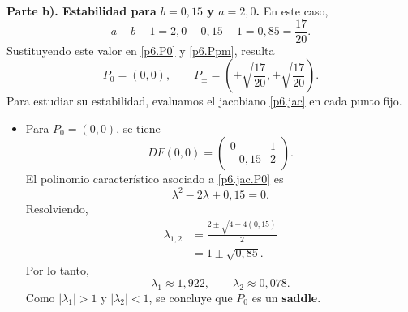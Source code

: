 \documentclass[12pt]{article}
\begin{document}
\textbf{Parte b). Estabilidad para $b=0{,}15$ y $a=2{,}0$.}
En este caso,
\begin{equation*}
    a-b-1=2{,}0-0{,}15-1=0{,}85=\frac{17}{20}.
\end{equation*}
Sustituyendo este valor en \eqref{p6.P0} y \eqref{p6.Ppm}, resulta
\begin{equation}\label{p6.fijos.a2}
    P_0=(0,0),
    \qquad
    P_\pm=\left(\pm\sqrt{\frac{17}{20}},\pm\sqrt{\frac{17}{20}}\right).
\end{equation}
Para estudiar su estabilidad, evaluamos el jacobiano \eqref{p6.jac} en cada punto fijo.

\begin{itemize}
    \item Para $P_0=(0,0)$, se tiene
    \begin{equation}\label{p6.jac.P0}
        DF(0,0)=
        \begin{pmatrix}
            0 & 1\\
            -0{,}15 & 2
        \end{pmatrix}.
    \end{equation}
    El polinomio característico asociado a \eqref{p6.jac.P0} es
    \begin{equation*}
        \lambda^2-2\lambda+0{,}15=0.
    \end{equation*}
    Resolviendo,
    \begin{align*}
        \lambda_{1,2}
        &=\frac{2\pm\sqrt{4-4(0{,}15)}}{2}\\
        &=1\pm\sqrt{0{,}85}.
    \end{align*}
    Por lo tanto,
    \begin{equation*}
        \lambda_1\approx 1{,}922,
        \qquad
        \lambda_2\approx 0{,}078.
    \end{equation*}
    Como $|\lambda_1|>1$ y $|\lambda_2|<1$, se concluye que $P_0$ es un \textbf{saddle}.


\end{itemize}
\end{document}
